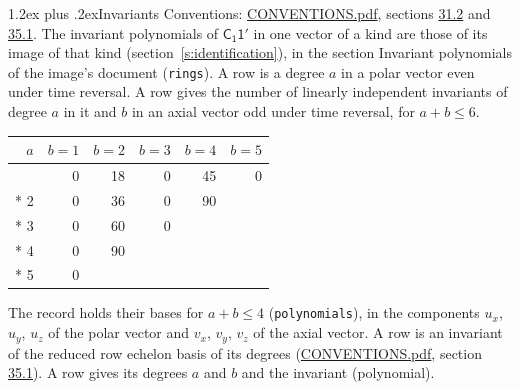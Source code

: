 \documentclass[10pt,a4paper]{article}
\makeatletter
\renewcommand\section{\@startsection{section}{1}{\z@}{-3ex plus -1ex minus -.2ex}%
  {1.2ex plus .2ex}{\normalfont\large\sffamily\bfseries\color{parttitle}}}
\numberwithin{equation}{section}
\newcommand{\grp}[1]{\mathsf{#1}}
\makeatother
\begin{document}
\section{Invariants}\label{s:invariants}
Conventions: \href{../../CONVENTIONS.pdf}{CONVENTIONS.pdf}, sections \href{../../CONVENTIONS.pdf\#conv.31.2}{31.2} and \href{../../CONVENTIONS.pdf\#conv.35.1}{35.1}.
The invariant polynomials of $\grp{C_{1}1'}$ in one vector of a kind are those of its image of that kind (section~\ref{s:identification}), in the section Invariant polynomials of the image's document (\texttt{rings}).
\leavevmode\label{n:index.degree.polar}\label{n:index.degree.axial}A row is a degree $a$ in a polar vector even under time reversal. A row gives the number of linearly independent invariants of degree $a$ in it and $b$ in an axial vector odd under time reversal, for $a + b \le 6$.
{\small\begin{longtable}{@{}rrrrrr@{}}\toprule
$a$ & $b = 1$ & $b = 2$ & $b = 3$ & $b = 4$ & $b = 5$\\\midrule\endhead
\bottomrule\endfoot\endlastfoot
1 & 0 & 18 & 0 & 45 & 0\\*
2 & 0 & 36 & 0 & 90 & \\*
3 & 0 & 60 & 0 &  & \\*
4 & 0 & 90 &  &  & \\*
5 & 0 &  &  &  & \\
\bottomrule\end{longtable}}
\leavevmode\label{n:local.component.polar}\label{n:local.component.axial}The record holds their bases for $a + b \le 4$ (\texttt{polynomials}), in the components $u_{x}$, $u_{y}$, $u_{z}$ of the polar vector and $v_{x}$, $v_{y}$, $v_{z}$ of the axial vector. \label{n:head.polynomial}A row is an invariant of the reduced row echelon basis of its degrees (\href{../../CONVENTIONS.pdf}{CONVENTIONS.pdf}, section \href{../../CONVENTIONS.pdf\#conv.35.1}{35.1}). A row gives its degrees $a$ and $b$ and the invariant (polynomial).
\end{document}
